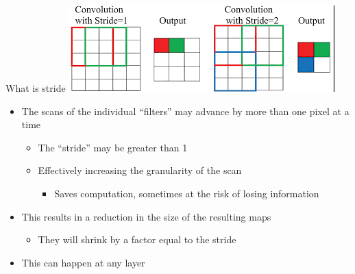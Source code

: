 \documentclass[default, aspectratio=169]{beamer}
\begin{document}
	\begin{frame}{What is stride}
		\centering
		\includegraphics[keepaspectratio, scale=0.9]{pic/stride.png}
		\begin{itemize}
			\item The scans of the individual ``filters'' may advance by more than one pixel at a time
			\begin{itemize}
				\item The ``stride'' may be greater than 1
				\item Effectively increasing the granularity of the scan
				\begin{itemize}
					\item Saves computation, sometimes at the risk of losing information
				\end{itemize}
			\end{itemize}
			\item This results in a reduction in the size of the resulting maps
			\begin{itemize}
				\item They will shrink by a factor equal to the stride
			\end{itemize}
			\item This can happen at any layer
		\end{itemize}
	\end{frame}
		
\end{document}
